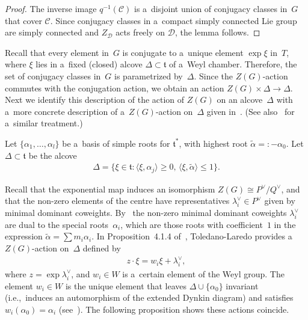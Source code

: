 \documentclass[11pt]{article}
\numberwithin{equation}{section}
\begin{document}
\begin{proof}
The inverse image $q^{-1}(\mathcal{C})$ is a~disjoint union of conjugacy classes in~$G$ that cover $\mathcal{C}$.
Since conjugacy classes in a~compact simply connected Lie group are simply connected and $Z_\mathcal{D}$ acts freely on
$\mathcal{D}$, the lemma follows.
\end{proof}

Recall that every element in~$G$ is conjugate to a~unique element $\exp \xi$ in~$T$, where $\xi$ lies in a~f\/ixed (closed)
alcove $\Delta \subset \mathfrak{t}$ of a~Weyl chamber.
Therefore, the set of conjugacy classes in~$G$ is parametrized by~$\Delta$.
Since the $Z(G)$-action commutes with the conjugation action, we obtain an action $Z(G)\times \Delta \to \Delta$.
Next we identify this description of the action of $Z(G)$ on an alcove~$\Delta$ with a~more concrete description of
a~$Z(G)$-action on~$\Delta$ given in~\cite[Section~4.1]{TL}.
(See also~\cite[Section~3.1]{BFM} for a~similar treatment.)

Let $\{\alpha_1, \ldots, \alpha_l \}$ be a~basis of simple roots for $\mathfrak{t}^*$, with highest root
$\tilde{\alpha}=:-\alpha_0$.
Let $\Delta \subset \mathfrak{t}$ be the alcove
\begin{gather*}
\Delta = \{\xi \in \mathfrak{t} \colon \langle \xi,\alpha_j\rangle \geq 0, \, \langle \xi, \tilde{\alpha}\rangle \leq 1
\}.
\end{gather*}

Recall that the exponential map induces an isomorphism $Z(G)\cong P^\vee/Q^\vee$, and that the non-zero elements of the
centre have representatives $\lambda_i^\vee \in P^\vee$ given by minimal dominant coweights.
By~\cite[Lemma~2.3]{TL} the non-zero minimal dominant coweights $\lambda_i^\vee$ are dual to the special roots~$\alpha_i$, which are those roots with coef\/f\/icient~$1$ in the expression $\tilde{\alpha}=\sum m_i\alpha_i$.
In Proposition~4.1.4 of~\cite{TL}, Toledano-Laredo provides a~$Z(G)$-action on~$\Delta$ def\/ined by
\begin{gather*}
z\cdot \xi = w_i \xi + \lambda_i^\vee,
\end{gather*}
where $z=\exp \lambda_i^\vee$, and $w_i \in W$ is a~certain element of the Weyl group.
The element $w_i \in W$ is the unique element that leaves $\Delta \cup \{{\alpha_0} \}$ invariant (i.e.,~induces an
automorphism of the extended Dynkin diagram) and satisf\/ies $w_i({\alpha_0}) = \alpha_i$ (see~\cite[Proposition 4.1.2]{TL}).
The following proposition shows these actions coincide.
\end{document}
